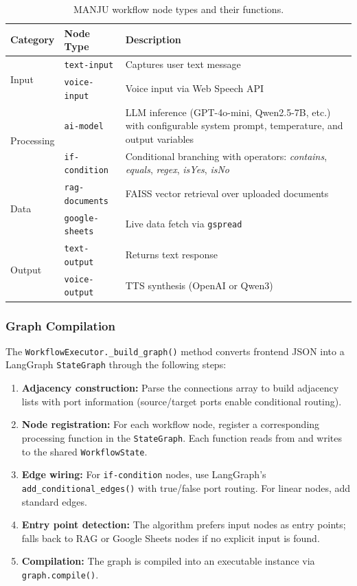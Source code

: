 \documentclass[10pt, a4paper, twocolumn]{article}
\begin{document}
\begin{table}[t]
    \centering
    \caption{MANJU workflow node types and their functions.}
    \label{tab:node_types}
    \small
    \begin{tabular}{@{}llp{3.8cm}@{}}
        \toprule
        \textbf{Category} & \textbf{Node Type} & \textbf{Description} \\
        \midrule
        \multirow{2}{*}{Input} & \texttt{text-input} & Captures user text message \\
        & \texttt{voice-input} & Voice input via Web Speech API \\
        \midrule
        \multirow{2}{*}{Processing} & \texttt{ai-model} & LLM inference (GPT-4o-mini, Qwen2.5-7B, etc.) with configurable system prompt, temperature, and output variables \\
        & \texttt{if-condition} & Conditional branching with operators: \textit{contains}, \textit{equals}, \textit{regex}, \textit{isYes}, \textit{isNo} \\
        \midrule
        \multirow{2}{*}{Data} & \texttt{rag-documents} & FAISS vector retrieval over uploaded documents \\
        & \texttt{google-sheets} & Live data fetch via \texttt{gspread} \\
        \midrule
        \multirow{2}{*}{Output} & \texttt{text-output} & Returns text response \\
        & \texttt{voice-output} & TTS synthesis (OpenAI or Qwen3) \\
        \bottomrule
    \end{tabular}
\end{table}

\subsubsection{Graph Compilation}
The \texttt{WorkflowExecutor.\_build\_graph()} method converts frontend JSON into a LangGraph \texttt{StateGraph} through the following steps:

\begin{enumerate}[label=\arabic*.]
    \item \textbf{Adjacency construction:} Parse the connections array to build adjacency lists with port information (source/target ports enable conditional routing).
    \item \textbf{Node registration:} For each workflow node, register a corresponding processing function in the \texttt{StateGraph}. Each function reads from and writes to the shared \texttt{WorkflowState}.
    \item \textbf{Edge wiring:} For \texttt{if-condition} nodes, use LangGraph's \texttt{add\_conditional\_edges()} with true/false port routing. For linear nodes, add standard edges.
    \item \textbf{Entry point detection:} The algorithm prefers input nodes as entry points; falls back to RAG or Google Sheets nodes if no explicit input is found.
    \item \textbf{Compilation:} The graph is compiled into an executable instance via \texttt{graph.compile()}.
\end{enumerate}
\end{document}

